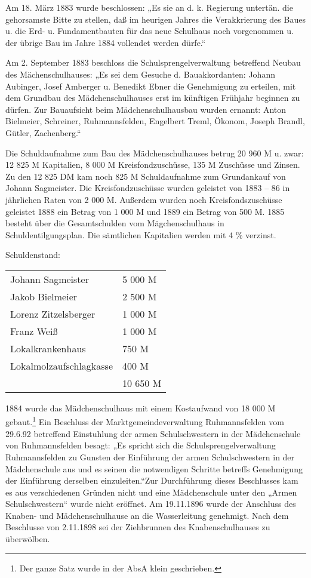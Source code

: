 \documentclass[12pt,a4paper]{book}
\begin{document}
Am 18. März 1883 wurde beschlossen: „Es sie an d. k. Regierung untertän.
die gehorsamste Bitte zu stellen, daß im heurigen Jahres die
Verakkrierung des Baues u. die Erd- u. Fundamentbauten für das neue
Schulhaus noch vorgenommen u. der übrige Bau im Jahre 1884 vollendet
werden dürfe.“

Am 2. September 1883 beschloss die Schulsprengelverwaltung betreffend
Neubau des Mächenschulhauses: „Es sei dem Gesuche d. Bauakkordanten:
Johann Aubinger, Josef Amberger u. Benedikt Ebner die Genehmigung zu
erteilen, mit dem Grundbau des Mädchenschulhauses erst im künftigen
Frühjahr beginnen zu dürfen. Zur Bauaufsicht beim Mädchenschulhausbau
wurden ernannt: Anton Bielmeier, Schreiner, Ruhmannsfelden, Engelbert
Treml, Ökonom, Joseph Brandl, Gütler, Zachenberg.“

Die Schuldaufnahme zum Bau des Mädchenschulhauses betrug 20 960 M u.
zwar: 12 825 M Kapitalien, 8 000 M Kreisfondzuschüsse, 135 M Zuschüsse
und Zinsen. Zu den 12 825 DM kam noch 825 M Schuldaufnahme zum
Grundankauf von Johann Sagmeister. Die Kreisfondzuschüsse wurden
geleistet von 1883 – 86 in jährlichen Raten von 2 000 M. Außerdem wurden
noch Kreisfondszuschüsse geleistet 1888 ein Betrag von 1 000 M und 1889
ein Betrag von 500 M. 1885 besteht über die Gesamtschulden vom
Mägchenschulhaus in Schuldentilgungsplan. Die sämtlichen Kapitalien
werden mit 4
\% verzinst.

Schuldenstand:

\begin{tabular}{ll}
Johann Sagmeister & 5 000 M \\
Jakob Bielmeier & 2 500 M \\
Lorenz Zitzelsberger & 1 000 M \\
Franz Weiß & 1 000 M \\
Lokalkrankenhaus & 750 M \\
Lokalmolzaufschlagkasse & 400 M \\
\hline
& 10 650 M  \\
\end{tabular}

1884 wurde das Mädchenschulhaus mit einem Kostaufwand von 18 000 M
gebaut.\footnote{Der ganze Satz wurde in der AbsA klein geschrieben.}
Ein Beschluss der Marktgemeindeverwaltung Ruhmannsfelden vom 29.6.92
betreffend Einstuhlung der armen Schulschwestern in der Mädchenschule
von Ruhmannsfelden besagt: „Es spricht sich die Schulsprengelverwaltung
Ruhmannsfelden zu Gunsten der Einführung der armen Schulschwestern in
der Mädchenschule aus und es seinen die notwendigen Schritte betreffs
Genehmigung der Einführung derselben einzuleiten.“Zur Durchführung
dieses Beschlusses kam es aus verschiedenen Gründen nicht und eine
Mädchenschule unter den „Armen Schulschwestern“ wurde nicht eröffnet. Am
19.11.1896 wurde der Anschluss des Knaben- und Mädchenschulhause an die
Wasserleitung genehmigt. Nach dem Beschlusse von 2.11.1898 sei der
Ziehbrunnen des Knabenschulhauses zu überwölben.
\end{document}
